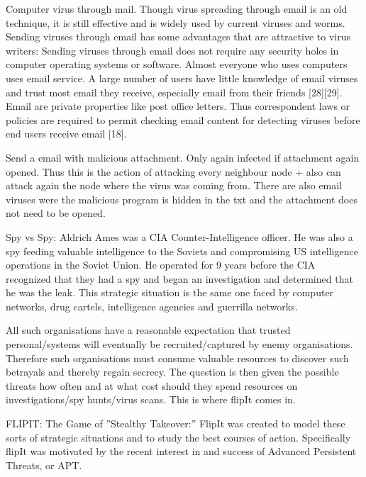 
Computer virus through mail. 
Though virus spreading through email is an old technique, it is still effective and is widely used by
current viruses and worms. Sending viruses through email has some advantages that are attractive to
virus writers:
 Sending viruses through email does not require any security holes in computer operating systems
or software.
 Almost everyone who uses computers uses email service.
 A large number of users have little knowledge of email viruses and trust most email they receive,
especially email from their friends [28][29].
 Email are private properties like post office letters. Thus correspondent laws or policies are required
to permit checking email content for detecting viruses before end users receive email [18].

Send a email with malicious attachment. Only again infected if attachment again opened. Thus this is the action of attacking every neighbour node + also can attack again the node where the virus was coming from.
There are also email viruses were the malicious program is hidden in the txt and the attachment does not need to be opened. 


Spy vs Spy: Aldrich Ames was a CIA Counter-Intelligence officer. He was also a spy feeding valuable intelligence to the Soviets and compromising US intelligence operations in the Soviet Union. He operated for 9 years before the CIA recognized that they had a spy and began an investigation and determined that he was the leak. This strategic situation is the same one faced by computer networks, drug cartels, intelligence agencies and guerrilla networks.

All such organisations have a reasonable expectation that trusted personal/systems will eventually be recruited/captured by enemy organisations. Therefore such organisations must consume valuable resources to discover such betrayals and thereby regain secrecy. The question is then given the possible threats how often and at what cost should they spend resources on investigations/spy hunts/virus scans. This is where flipIt comes in.

FLIPIT: The Game of ''Stealthy Takeover:'' FlipIt was created to model these sorts of strategic situations and to study the best courses of action. Specifically flipIt was motivated by the recent interest in and success of Advanced Persistent Threats, or APT.

